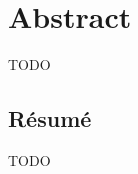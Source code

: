 \begingroup
\let\clearpage\relax
\let\cleardoublepage\relax
\let\cleardoublepage\relax

\chapter*{Abstract}
TODO

\vfill

\begin{otherlanguage}{french}
\chapter*{Résumé}
TODO
\end{otherlanguage}

\endgroup

\vfill
